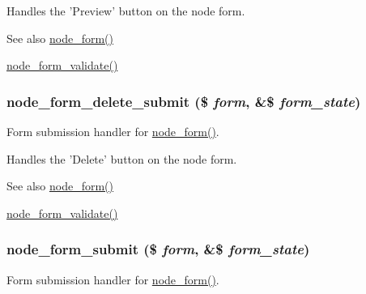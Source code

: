 Handles the 'Preview' button on the node form.

\begin{DoxySeeAlso}{See also}
\hyperlink{group__forms_ga267299500e205db099ee4e8396769d3f}{node\_\-form()} 

\hyperlink{node_8pages_8inc_aedf9f810594bc4c402a92cb197930bd9}{node\_\-form\_\-validate()} 
\end{DoxySeeAlso}
\hypertarget{node_8pages_8inc_a5cdd62f89098801ac87b85d8c61e7ee2}{
\subsubsection[{node\_\-form\_\-delete\_\-submit}]{\setlength{\rightskip}{0pt plus 5cm}node\_\-form\_\-delete\_\-submit (\$ {\em form}, \/  \&\$ {\em form\_\-state})}}
\label{node_8pages_8inc_a5cdd62f89098801ac87b85d8c61e7ee2}
Form submission handler for \hyperlink{group__forms_ga267299500e205db099ee4e8396769d3f}{node\_\-form()}.

Handles the 'Delete' button on the node form.

\begin{DoxySeeAlso}{See also}
\hyperlink{group__forms_ga267299500e205db099ee4e8396769d3f}{node\_\-form()} 

\hyperlink{node_8pages_8inc_aedf9f810594bc4c402a92cb197930bd9}{node\_\-form\_\-validate()} 
\end{DoxySeeAlso}
\hypertarget{node_8pages_8inc_addb125e26be73cec8769d2e729d7aa2c}{
\subsubsection[{node\_\-form\_\-submit}]{\setlength{\rightskip}{0pt plus 5cm}node\_\-form\_\-submit (\$ {\em form}, \/  \&\$ {\em form\_\-state})}}
\label{node_8pages_8inc_addb125e26be73cec8769d2e729d7aa2c}
Form submission handler for \hyperlink{group__forms_ga267299500e205db099ee4e8396769d3f}{node\_\-form()}.

